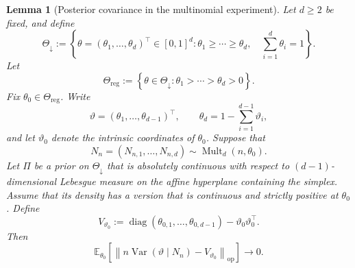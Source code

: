 \documentclass[10pt,a4paper]{amsart}
\newtheorem{lemma}[theorem]{Lemma}
\theoremstyle{named}
\theoremstyle{named1}
\theoremstyle{plain}
\theoremstyle{remark}
\begin{document}
\appendix
\setcounter{section}{4}
\setcounter{theorem}{0}
\begin{lemma}[Posterior covariance in the multinomial experiment]
\label{lem:multinomial-posterior-covariance}
Let $d\geq2$ be fixed, and define
\[
    \Theta_{\downarrow}
    :=
    \left\{
        \theta=(\theta_1,\ldots,\theta_d)^\top\in[0,1]^d:
        \theta_1\geq\cdots\geq\theta_d,\quad
        \sum_{i=1}^d\theta_i=1
    \right\}.
\]
Let
\[
    \Theta_{\mathrm{reg}}
    :=
    \left\{
        \theta\in\Theta_{\downarrow}:
        \theta_1>\cdots>\theta_d>0
    \right\}.
\]
Fix $\theta_0\in\Theta_{\mathrm{reg}}$. Write
\[
    \vartheta=(\theta_1,\ldots,\theta_{d-1})^\top,
    \qquad
    \theta_d=1-\sum_{i=1}^{d-1}\vartheta_i,
\]
and let $\vartheta_0$ denote the intrinsic coordinates of $\theta_0$.
Suppose that
\[
    N_n=(N_{n,1},\ldots,N_{n,d})
    \sim\operatorname{Mult}_d(n,\theta_0).
\]
Let $\Pi$ be a prior on $\Theta_{\downarrow}$ that is absolutely
continuous with respect to $(d-1)$-dimensional Lebesgue measure on the
affine hyperplane containing the simplex. Assume that its density has a
version that is continuous and strictly positive at $\theta_0$.
Define
\[
    V_{\vartheta_0}
    :=
    \operatorname{diag}(\theta_{0,1},\ldots,\theta_{0,d-1})
    -\vartheta_0\vartheta_0^\top.
\]
Then
\[
    \mathbb E_{\theta_0}
    \left[
        \left\|
            n\operatorname{Var}(\vartheta\mid N_n)
            -V_{\vartheta_0}
        \right\|_{\mathrm{op}}
    \right]
    \rightarrow0.
\]
\end{lemma}
\end{document}
